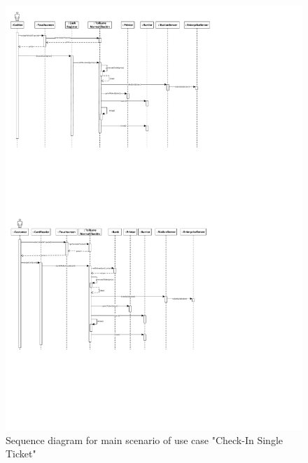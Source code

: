 \begin{figure}[H]
\centerline{\includegraphics[width=1.4\columnwidth]{"img/sequence_diagrams/SequenceDiagram_CheckInSingleTicket_cash"}}
\caption{Sequence diagram for main scenario of use case "Check-In Single Ticket"}
\label{fig:seq_single_ticket_main}
\end{figure}


